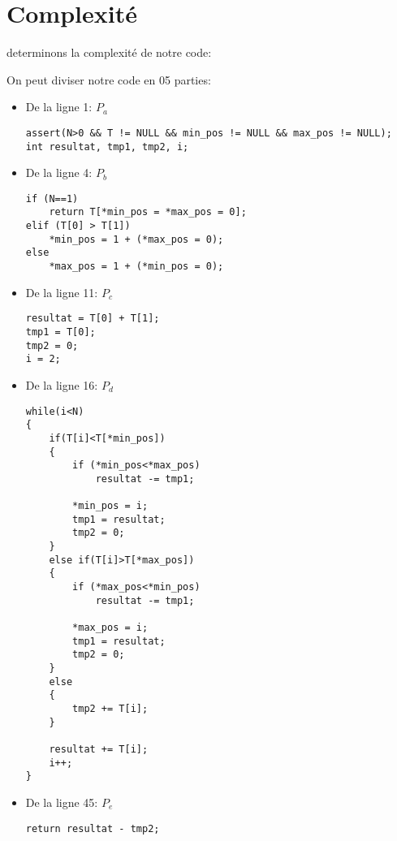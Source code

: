 \section{Complexité}\label{complexite}

\par
determinons la complexité de notre code:

\raggedright\par

On peut diviser notre code en 05 parties:
\begin{itemize}

\item De la ligne 1: \textbf{$P_a$}
\begin{lstlisting}
assert(N>0 && T != NULL && min_pos != NULL && max_pos != NULL);
int resultat, tmp1, tmp2, i;
\end{lstlisting}

\item De la ligne 4: \textbf{$P_b$}
\begin{lstlisting}
if (N==1) 
    return T[*min_pos = *max_pos = 0];
elif (T[0] > T[1])
    *min_pos = 1 + (*max_pos = 0);
else
    *max_pos = 1 + (*min_pos = 0);
\end{lstlisting}

\item De la ligne 11: \textbf{$P_c$}
\begin{lstlisting}
resultat = T[0] + T[1];
tmp1 = T[0];
tmp2 = 0;
i = 2;
\end{lstlisting}

\item De la ligne 16: \textbf{$P_d$}
\begin{lstlisting}
while(i<N) 
{
    if(T[i]<T[*min_pos])
    {
        if (*min_pos<*max_pos) 
            resultat -= tmp1;
            
        *min_pos = i;
        tmp1 = resultat;
        tmp2 = 0;
    }
    else if(T[i]>T[*max_pos])
    {
        if (*max_pos<*min_pos) 
            resultat -= tmp1;
        
        *max_pos = i;
        tmp1 = resultat;
        tmp2 = 0;
    }
    else 
    {
        tmp2 += T[i];
    }
    
    resultat += T[i];
    i++;
}
\end{lstlisting}

\item De la ligne 45: \textbf{$P_e$}
\begin{lstlisting}
return resultat - tmp2;
\end{lstlisting}

\end{itemize}

